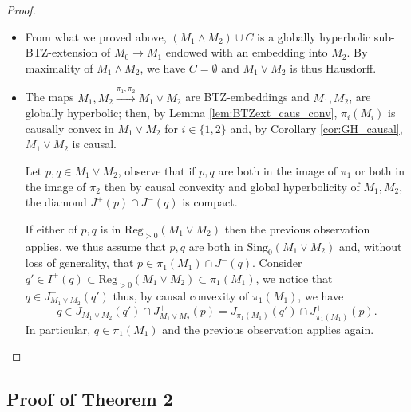 \documentclass[a4paper,12pt]{article}
\def\N{\mathbb N}
\def\sing{\mathrm{Sing}}
\def\Reg{\mathrm{Reg}}
\def\pgcd{M_1\wedge M_2}
\def\ppcm{M_1\vee M_2}
\def\reg{\Reg}
\begin{document}
\begin{proof}
\begin{itemize}
Consider $I:= \left\{t_0\in [0,1] ~|~ c([0,t_0])\subset \pgcd \cup C\right\}$;  since $\pgcd\cup C$ is open, $I$ is open. Let $t_0 = \sup I$ and consider a decreasing sequence $(q_n)_{n\in\N} \in M_0^\N$ converging toward $c(t_0)$; notice that $q_n\in J^+_{\pgcd\cup C}(c(0))$ so that $\phi(q_n)\in J^+_{M_2}(\overline\phi\circ c(0))$. Therefore, the sequence $(\phi(q_n))_{n\in\N}$ is decreasing and bounded below in $M_2$; by global hyperbolicity of $M_2$, it converges in $M_2$. Finally,  $c(t_0)\in  \pgcd \cup C$  and $I$ is closed. 
To conclude, $I$ is both open and closed in $[0,1]$ and is thus equal to $[0,1]$; in particular, $c(1)=q \in  \pgcd \cup C$. 

$(\pgcd) \cup C$ is then globally hyperbolic.


					
				\item From what we proved above,
					$(\pgcd)\cup C$ is a globally hyperbolic sub-BTZ-extension of $M_0\rightarrow M_1$
					endowed with an embedding into $M_2$. 
					By maximality of $\pgcd$, we have $C=\emptyset$ and  $\ppcm$ is thus Hausdorff.
					\item The maps $M_1,M_2\xrightarrow{\pi_1,\pi_2} \ppcm$ are BTZ-embeddings and $M_1,M_2$, are globally hyperbolic; then, by Lemma \ref{lem:BTZext_caus_conv}, $\pi_i(M_i)$ is causally convex in $\ppcm$ for $i\in\{1,2\}$ and, by Corollary \ref{cor:GH_causal}, $\ppcm$ is causal.
					
					Let $p,q\in \ppcm$, observe that if $p,q$ are both in the image of $\pi_1$ or both in the image of $\pi_2$ then by causal convexity and global hyperbolicity of $M_1,M_2$, the diamond $J^+(p)\cap J^-(q)$ is compact. 
					
If either of $p,q$ is in $\reg_{>0}(\ppcm)$ then the previous observation applies, we thus assume that $p,q$ are both in $\sing_0(\ppcm)$ and, without loss of generality, that $p\in \pi_1(M_1)\cap J^-(q)$.  Consider $q'\in I^+(q)\subset \reg_{>0}(\ppcm)\subset \pi_1(M_1)$, we notice that $q\in J^-_{\ppcm}(q')$ thus, by causal convexity of $\pi_1(M_1)$, we have $$q\in J^-_{\ppcm}(q')\cap J^+_{\ppcm}(p) = J^-_{\pi_1(M_1)}(q')\cap J^+_{\pi_1(M_1)}(p).$$
In particular, $q\in \pi_1(M_1)$ and the previous observation applies again.
					
					
			\end{itemize}
		\end{proof}

\subsection{Proof of Theorem 2}
\end{document}
